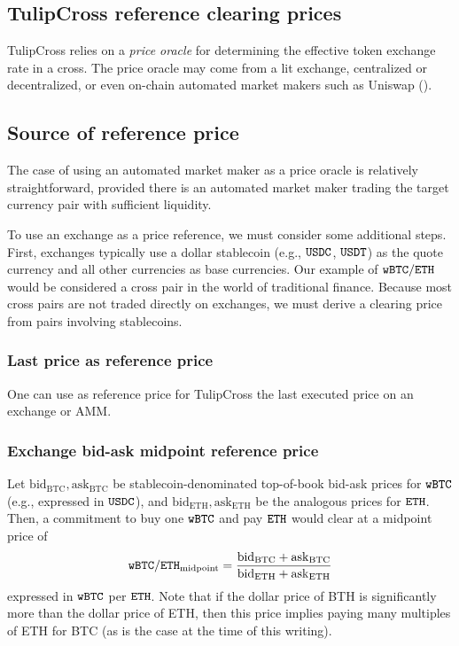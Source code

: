 \documentclass[11pt, reqno]{amsart}
\theoremstyle{definition}
\theoremstyle{remark}
\newcommand{\bidbtc}{\mathrm{bid}_\mathrm{BTC}}
\newcommand{\askbtc}{\mathrm{ask}_\mathrm{BTC}}
\newcommand{\bideth}{\mathrm{bid}_\mathrm{ETH}}
\newcommand{\asketh}{\mathrm{ask}_\mathrm{ETH}}
\newcommand{\BTC}{\textnormal{\texttt{wBTC}}}
\newcommand{\ETH}{\textnormal{\texttt{ETH}}}
\newcommand{\USDC}{\textnormal{\texttt{USDC}}}
\newcommand{\USDT}{\textnormal{\texttt{USDT}}}
\newcommand{\midpoint}{\mathrm{midpoint}}
\begin{document}
\subsection{TulipCross reference clearing prices}
TulipCross relies on a \emph{price oracle} for determining the effective
token exchange rate in a cross. The price oracle may come from a lit
exchange, centralized or decentralized, or even on-chain automated market
makers such as Uniswap (\cite[\S 2.2]{AdZiRo20}).

\subsection{Source of reference price}
The case of using an automated market maker as a price oracle is relatively
straightforward, provided there is an automated market maker trading the
target currency pair with sufficient liquidity.

To use an exchange as a price reference, we must consider some additional
steps. First, exchanges typically use a dollar stablecoin (e.g., $\USDC$,
$\USDT$) as the quote currency and all other currencies as base currencies. Our
example of $\BTC/\ETH$ would be considered a cross pair in the world of
traditional finance. Because most cross pairs are not traded directly on
exchanges, we must derive a clearing price from pairs involving stablecoins.

\subsubsection{Last price as reference price}
One can use as reference price for TulipCross the last executed price on an
exchange or AMM.

\subsubsection{Exchange bid-ask midpoint reference price}
Let $\bidbtc, \askbtc$ be stablecoin-denominated top-of-book bid-ask prices
for $\BTC$ (e.g., expressed in $\USDC$), and $\bideth, \asketh$ be the analogous
prices for $\ETH$. Then, a commitment to buy one $\BTC$ and pay $\ETH$ would
clear at a midpoint price of
\[
    \BTC/\ETH_{\midpoint} = \frac{\bidbtc + \askbtc}{\bideth + \asketh}
\]
expressed in $\BTC$ per $\ETH$. Note that if the dollar price of BTH is significantly
more than the dollar price of ETH, then this price implies paying many
multiples of ETH for BTC (as is the case at the time of this writing).
\end{document}
